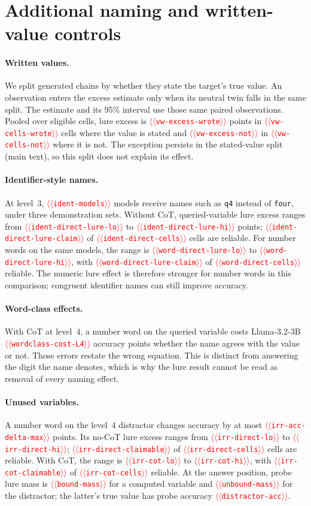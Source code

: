 \documentclass[11pt]{article}
\providecommand{\NUM}[1]{\textcolor{red}{$\langle\langle$\texttt{#1}$\rangle\rangle$}}
\begin{document}
\section{Additional naming and written-value controls}
\label{app:controls}

\paragraph{Written values.} We split generated chains by whether they state the target's true
value. An observation enters the excess estimate only when its neutral twin falls in the same
split. The estimate and its 95\% interval use those same paired observations. Pooled over
eligible cells, lure excess is \NUM{vw-excess-wrote} points in \NUM{vw-cells-wrote} cells where
the value is stated and \NUM{vw-excess-not} in \NUM{vw-cells-not} where it is not. The exception
persists in the stated-value split (main text), so this split does not explain its effect.

\paragraph{Identifier-style names.} At level~3, \NUM{ident-models} models receive names such as
\texttt{q4} instead of \texttt{four}, under three demonstration sets. Without CoT, queried-variable
lure excess ranges from \NUM{ident-direct-lure-lo} to \NUM{ident-direct-lure-hi} points;
\NUM{ident-direct-lure-claim} of \NUM{ident-direct-cells} cells are reliable. For number words
on the same models, the range is \NUM{word-direct-lure-lo} to \NUM{word-direct-lure-hi}, with
\NUM{word-direct-lure-claim} of \NUM{word-direct-cells} reliable. The numeric lure effect is
therefore stronger for number words in this comparison; congruent identifier names can still
improve accuracy.

\paragraph{Word-class effects.} With CoT at level~4, a number word on the queried variable costs
Llama-3.2-3B \NUM{wordclass-cost-L4} accuracy points whether the name agrees with the value or
not. Those errors restate the wrong equation. This is distinct from answering the digit the
name denotes, which is why the lure result cannot be read as removal of every naming effect.

\paragraph{Unused variables.} A number word on the level~4 distractor changes accuracy by at
most \NUM{irr-acc-delta-max} points. Its no-CoT lure excess ranges from \NUM{irr-direct-lo} to
\NUM{irr-direct-hi}; \NUM{irr-direct-claimable} of \NUM{irr-direct-cells} cells are reliable.
With CoT, the range is \NUM{irr-cot-lo} to \NUM{irr-cot-hi}, with
\NUM{irr-cot-claimable} of \NUM{irr-cot-cells} reliable. At the answer position, probe lure mass
is \NUM{bound-mass} for a computed variable and \NUM{unbound-mass} for the distractor; the
latter's true value has probe accuracy \NUM{distractor-acc}.
\end{document}
